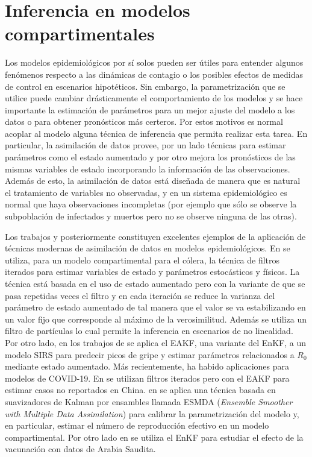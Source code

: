 \section{Inferencia en modelos compartimentales}

Los modelos epidemiológicos por sí solos pueden ser útiles para entender algunos fenómenos respecto a las dinámicas de contagio o los posibles efectos de medidas de control en escenarios hipotéticos. Sin embargo, la parametrización que se utilice puede cambiar drásticamente el comportamiento de los modelos y se hace importante la estimación de parámetros para un mejor ajuste del modelo a los datos o para obtener pronósticos más certeros. Por estos motivos es normal acoplar al modelo alguna técnica de inferencia que permita realizar esta tarea. En particular, la asimilación de datos provee, por un lado técnicas para estimar parámetros como el estado aumentado y por otro mejora los pronósticos de las mismas variables de estado incorporando la información de las observaciones. Además de esto, la asimilación de datos está diseñada de manera que es natural el tratamiento de variables no observadas, y en un sistema epidemiológico es normal que haya observaciones incompletas (por ejemplo que sólo se observe la subpoblación de infectados y muertos pero no se observe ninguna de las otras). 

Los trabajos \cite{Ionides2006} y posteriormente \cite{Shaman2012, Shaman2013} constituyen excelentes ejemplos de la aplicación de técnicas modernas de asimilación de datos en modelos epidemiológicos. En \cite{Ionides2006} se utiliza, para un modelo compartimental para el cólera, la técnica de filtros iterados para estimar variables de estado y parámetros estocásticos y físicos. La técnica está basada en el uso de estado aumentado pero con la variante de que se pasa repetidas veces el filtro y en cada iteración se reduce la varianza del parámetro de estado aumentado de tal manera que el valor se va estabilizando en un valor fijo que corresponde al máximo de la verosimilitud. Además se utiliza un filtro de partículas lo cual permite la inferencia en escenarios de no linealidad. Por otro lado, en los trabajos de \cite{Shaman2012, Shaman2013} se aplica el EAKF, una variante del EnKF, a un modelo SIRS para predecir picos de gripe y estimar parámetros relacionados a $R_0$ mediante estado aumentado. Más recientemente, ha habido aplicaciones para modelos de COVID-19. En \cite{Li2020} se utilizan filtros iterados pero con el EAKF para estimar casos no reportados en China. en \cite{Evensen2020} se aplica una técnica basada en suavizadores de Kalman por ensambles llamada ESMDA (\textit{Ensemble Smoother with Multiple Data Assimilation}) para calibrar la parametrización del modelo y, en particular, estimar el número de reproducción efectivo en un modelo compartimental. Por otro lado en \cite{Ghostine2021} se utiliza el EnKF para estudiar el efecto de la vacunación con datos de Arabia Saudita.

